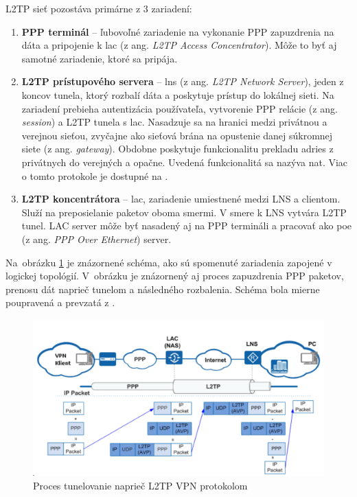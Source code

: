L2TP sieť pozostáva primárne z 3 zariadení:
\begin{enumerate}
	\item{\textbf{PPP terminál}} -- ľubovoľné zariadenie na vykonanie PPP zapuzdrenia na dáta a pripojenie k \acrshort{lac} (z ang. \textit{L2TP Access Concentrator}). Môže to byť aj samotné zariadenie, ktoré sa pripája. 
	\item{\textbf{L2TP prístupového servera}} -- \acrshort{lns} (z ang. \textit{L2TP Network Server}), jeden z koncov tunela, ktorý rozbalí dáta a poskytuje prístup do lokálnej sieti. Na zariadení prebieha autentizácia používateľa, vytvorenie PPP relácie (z ang. \textit{session}) a L2TP tunela s \acrshort{lac}. Nasadzuje sa na hranici medzi privátnou a verejnou sieťou, zvyčajne ako sieťová brána na opustenie danej súkromnej siete (z ang. \textit{gateway}). Obdobne poskytuje funkcionalitu prekladu adries z privátnych do verejných a opačne. Uvedená funkcionalitá sa nazýva \acrfull{nat}. Viac o tomto protokole je dostupné na \cite{nat}.   
	\item{\textbf{L2TP koncentrátora}} -- \acrshort{lac}, zariadenie umiestnené medzi LNS a clientom. Služí na preposielanie paketov oboma smermi. V smere k LNS vytvára L2TP tunel. LAC server môže byť nasadený aj na PPP termináli a pracovať ako \acrshort{poe} (z ang. \textit{PPP Over Ethernet}) server.
\end{enumerate}
Na~obrázku \ref{l2tp} je znázornené schéma, ako sú spomenuté zariadenia zapojené v logickej topológií. V~obrázku je znázornený aj proces zapuzdrenia PPP paketov, prenosu dát naprieč tunelom a následného rozbalenia. Schéma bola mierne poupravená a prevzatá z \cite{l2tphuawei}. 
\begin{figure}[!h]
	\centering
	\includegraphics[width=1\textwidth]{figures/l2tp}
	\caption{Proces tunelovanie naprieč L2TP VPN protokolom \cite{l2tphuawei}}
	\label{l2tp}
\end{figure}

